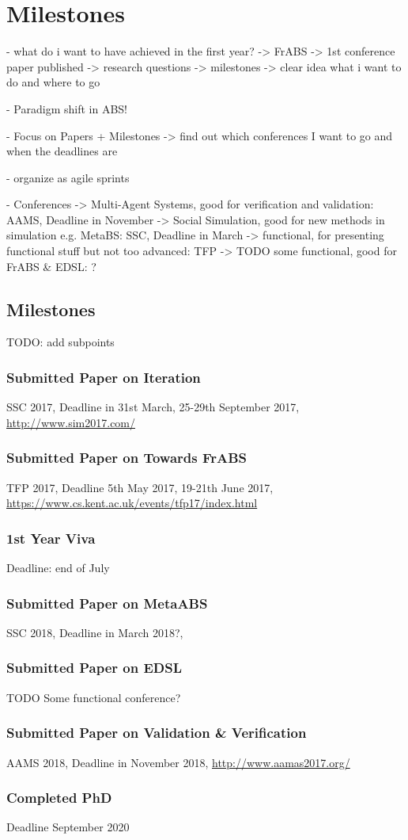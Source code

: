 \section{Milestones}

- what do i want to have achieved in the first year?
	-> FrABS
	-> 1st conference paper published
	-> research questions
	-> milestones
	-> clear idea what i want to do and where to go
	
- Paradigm shift in ABS!

- Focus on Papers + Milestones
	-> find out which conferences I want to go and when the deadlines are

- organize as agile sprints

- Conferences
	-> Multi-Agent Systems, good for verification and validation: 			AAMS, Deadline in November
	-> Social Simulation, good for new methods in simulation e.g. MetaBS: 	SSC, Deadline in March
	-> functional, for presenting functional stuff but not too advanced:	TFP	
	-> TODO some functional, good for FrABS \& EDSL:						?


\subsection{Milestones}

TODO: add subpoints

\subsubsection*{Submitted Paper on Iteration}
SSC 2017, Deadline in 31st March, 25-29th September 2017, \url{http://www.sim2017.com/}

\subsubsection*{Submitted Paper on Towards FrABS}
TFP 2017, Deadline 5th May 2017, 19-21th June 2017, \url{https://www.cs.kent.ac.uk/events/tfp17/index.html}

\subsubsection*{1st Year Viva}
Deadline: end of July

\subsubsection*{Submitted Paper on MetaABS}
SSC 2018, Deadline in March 2018?, 

\subsubsection*{Submitted Paper on EDSL}
TODO Some functional conference?

\subsubsection*{Submitted Paper on Validation \& Verification}
AAMS 2018, Deadline in November 2018, \url{http://www.aamas2017.org/}

\subsubsection*{Completed PhD}
Deadline September 2020